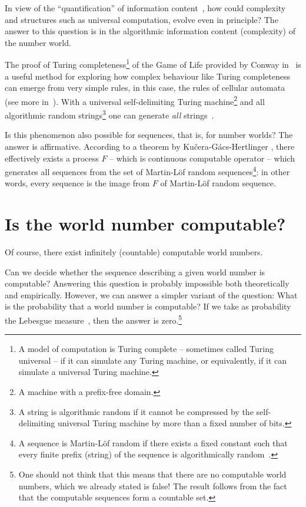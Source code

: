 \documentclass[12pt]{article}
\begin{document}
In view of the ``quantification'' of
information content~\cite{chaitin3,calude:02}, how could complexity and structures such as universal
computation, evolve even in principle?
The answer to this question is in the algorithmic information content (complexity) of the
number world.


The proof of  Turing
completeness\footnote{A model of computation is Turing complete -- sometimes called Turing universal --
if it can simulate any Turing machine,
or equivalently,
if it can simulate a universal Turing machine.}
of the Game of Life provided by Conway
in~\cite[Chapter 25, What Is Life?]{berl:82} is a useful method for exploring
how complex behaviour like Turing completeness can emerge from very simple rules,
in this case, the rules of cellular automata (see more in~\cite{univgamelife}).
 With a universal self-delimiting Turing machine\footnote{A machine with a prefix-free domain.}
and all algorithmic random strings\footnote{A string is algorithmic random  if it  cannot be compressed by the self-delimiting universal Turing machine by more than a fixed number of bits.} one can generate {\it all} strings~\cite{calude:02}.

 Is this phenomenon also possible for sequences, that is, for  number worlds?
 The answer is affirmative.
According  to a theorem by Ku\v{c}era-G\'{a}cs-Hertlinger \cite[p.~179]{calude:02}, there effectively exists
a process $F$ -- which is continuous  computable operator --  which generates all sequences from the set of Martin-L\"of random sequences\footnote{A sequence  is Martin-L\"of random if there exists a fixed constant such that every finite prefix (string) of the sequence is algorithmically random~\cite{calude:02}.}: in other words,  every sequence is the image from $F$  of Martin-L\"of random sequence.


\section{Is the world number computable?}
\label{computable}
Of course, there exist  infinitely (countable) computable world numbers.

Can we decide whether  the sequence describing a given world number is computable?
Answering this question is probably impossible  both theoretically and empirically.
However, we can answer a simpler variant of the question: What is the probability that a world number is computable?
If we take as probability the Lebesgue measure~\cite{calude:02}, then the answer is zero.\footnote{One should not think that this means that there are no computable world numbers,
which we already stated is false! The result follows from the fact that the computable sequences form a countable set.}
\end{document}
